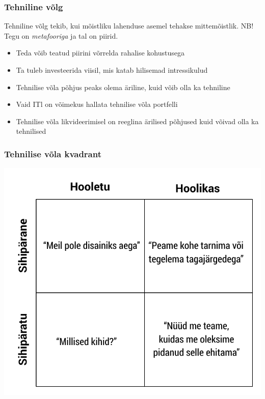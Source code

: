 \begin{frame}[fragile]
  \frametitle{Tehniline võlg}
	Tehniline võlg tekib, kui mõistliku lahenduse asemel tehakse mittemõistlik. NB! Tegu on \emph{metafooriga} ja tal on piirid.
  \begin{itemize}
	\item Teda võib teatud piirini võrrelda rahalise kohustusega
	\item Ta tuleb investeerida viisil, mis katab hilisemad intressikulud
	\item Tehnilise võla põhjus peaks olema äriline, kuid võib olla ka tehniline 
	\item Vaid ITl on võimekus hallata tehnilise võla portfelli
	\item Tehnilise võla likvideerimisel on reeglina ärilised põhjused kuid võivad olla ka tehnilised
  \end{itemize}
\end{frame}

\begin{frame}[fragile]
  \frametitle{Tehnilise võla kvadrant}
  	\begin{center}
			\includegraphics[width=.65\textwidth]{fowler.pdf}
	\end{center}
	\cite{fowlerdebt}
\end{frame}


